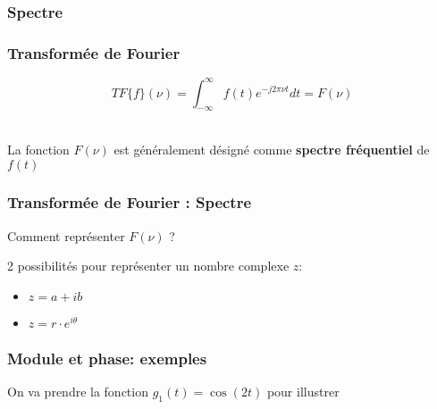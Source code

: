 \documentclass{beamer}
\begin{document}
\subsubsection{Spectre}
\begin{frame}
\frametitle{Transformée de Fourier}
\[ TF\{ f \}(\nu) = \displaystyle \int^{\infty}_{-\infty} f(t) e^{-j2\pi \nu t} dt   = F(\nu) \]\\
\vspace{1cm}

La fonction $F(\nu)$ est généralement désigné comme \textbf{spectre fréquentiel} de $f(t)$ \\

\vspace{1cm}

\end{frame}

\begin{frame}
\frametitle{Transformée de Fourier : Spectre }

Comment représenter $F(\nu)$  ? \\

\vspace{1cm} 

2 possibilités pour représenter un nombre complexe $z$: 

\begin{itemize}
\item $z = a+ ib$
\item $z = r\cdot e^{i \theta}$
\end{itemize} 

\vspace{1 cm}


\subsubsection{Module et phase: exemples}

\vspace{1cm}
{
On va prendre la fonction $g_1(t) = \cos(2 t)$ pour illustrer
}

\end{frame} 
\end{document}
